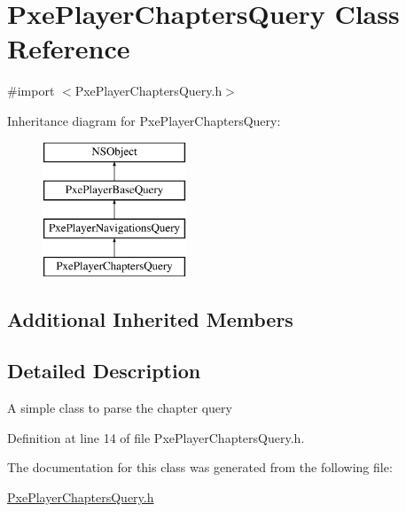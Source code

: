 \hypertarget{interface_pxe_player_chapters_query}{\section{Pxe\-Player\-Chapters\-Query Class Reference}
\label{interface_pxe_player_chapters_query}
}


{\ttfamily \#import $<$Pxe\-Player\-Chapters\-Query.\-h$>$}

Inheritance diagram for Pxe\-Player\-Chapters\-Query\-:\begin{figure}[H]
\begin{center}
\leavevmode
\includegraphics[height=4.000000cm]{interface_pxe_player_chapters_query}
\end{center}
\end{figure}
\subsection*{Additional Inherited Members}


\subsection{Detailed Description}
A simple class to parse the chapter query 

Definition at line 14 of file Pxe\-Player\-Chapters\-Query.\-h.



The documentation for this class was generated from the following file\-:\begin{DoxyCompactItemize}
\item 
\hyperlink{_pxe_player_chapters_query_8h}{Pxe\-Player\-Chapters\-Query.\-h}\end{DoxyCompactItemize}
